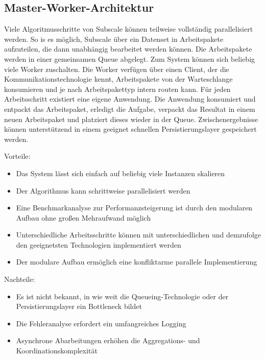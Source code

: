 \subsection{Master-Worker-Architektur}

Viele Algoritmusschritte von Subscale können teilweise vollständig parallelisiert werden. So is es möglich, Subscale über
ein Datenset in Arbeitspakete aufzuteilen, die dann unabhängig bearbeitet werden können. Die Arbeitspakete werden in einer
gemeinsamen Queue abgelegt. Zum System können sich beliebig viele Worker zuschalten. Die Worker verfügen über einen Client,
der die Kommunikationstechnologie kennt, Arbeitspakete von der Warteschlange konsumieren und je nach Arbeitspakettyp intern
routen kann. Für jeden Arbeitsschritt existiert eine eigene Anwendung. Die Anwendung konsumiert und entpackt das Arbeitspaket,
erledigt die Aufgabe, verpackt das Resultat in einem neuen Arbeitspaket und platziert dieses wieder in der Queue. Zwischenergebnisse
können unterstützend in einem geeignet schnellen Persistierungslayer gespeichert werden.

Vorteile:
\begin{itemize}
    \item Das System lässt sich einfach auf beliebig viele Instanzen skalieren
    \item Der Algorithmus kann schrittweise parallelisiert werden
    \item Eine Benchmarkanalyse zur Performanzsteigerung ist durch den modularen Aufbau ohne großen Mehraufwand möglich
    \item Unterschiedliche Arbeitsschritte können mit unterschiedlichen und demzufolge den geeignetsten Technologien implementiert werden
    \item Der modulare Aufbau ermöglich eine konfliktarme parallele Implementierung
\end{itemize}

Nachteile:
\begin{itemize}
    \item Es ist nicht bekannt, in wie weit die Queueing-Technologie oder der Persistierungslayer ein Bottleneck bildet
    \item Die Fehleranalyse erfordert ein umfangreiches Logging
    \item Asynchrone Abarbeitungen erhöhen die Aggregations- und Koordinationskomplexität
\end{itemize}